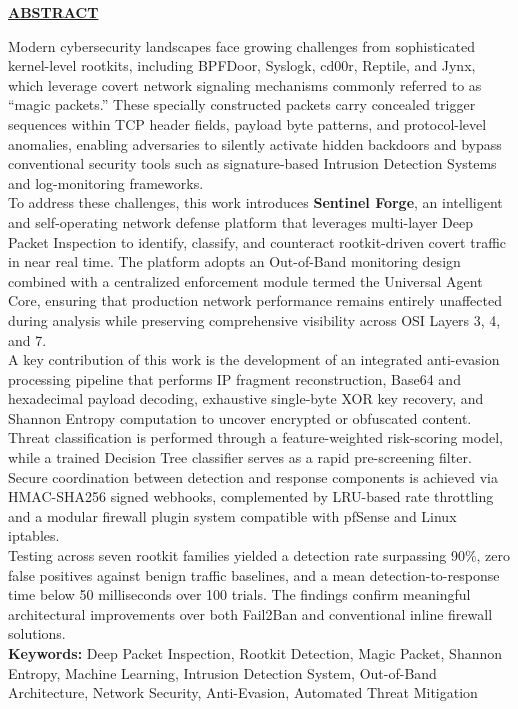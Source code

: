 {\centering
	\par
	\large \textbf{\underline{ABSTRACT}} \par
}\vspace{0.7cm}

\noindent Modern cybersecurity landscapes face growing challenges from sophisticated kernel-level rootkits, including BPFDoor, Syslogk, cd00r, Reptile, and Jynx, which leverage covert network signaling mechanisms commonly referred to as ``magic packets.'' These specially constructed packets carry concealed trigger sequences within TCP header fields, payload byte patterns, and protocol-level anomalies, enabling adversaries to silently activate hidden backdoors and bypass conventional security tools such as signature-based Intrusion Detection Systems and log-monitoring frameworks.\\

\noindent To address these challenges, this work introduces \textbf{Sentinel Forge}, an intelligent and self-operating network defense platform that leverages multi-layer Deep Packet Inspection to identify, classify, and counteract rootkit-driven covert traffic in near real time. The platform adopts an Out-of-Band monitoring design combined with a centralized enforcement module termed the Universal Agent Core, ensuring that production network performance remains entirely unaffected during analysis while preserving comprehensive visibility across OSI Layers 3, 4, and 7.\\

\noindent A key contribution of this work is the development of an integrated anti-evasion processing pipeline that performs IP fragment reconstruction, Base64 and hexadecimal payload decoding, exhaustive single-byte XOR key recovery, and Shannon Entropy computation to uncover encrypted or obfuscated content. Threat classification is performed through a feature-weighted risk-scoring model, while a trained Decision Tree classifier serves as a rapid pre-screening filter. Secure coordination between detection and response components is achieved via HMAC-SHA256 signed webhooks, complemented by LRU-based rate throttling and a modular firewall plugin system compatible with pfSense and Linux iptables.\\

\noindent Testing across seven rootkit families yielded a detection rate surpassing 90\%, zero false positives against benign traffic baselines, and a mean detection-to-response time below 50 milliseconds over 100 trials. The findings confirm meaningful architectural improvements over both Fail2Ban and conventional inline firewall solutions.\\

\noindent\textbf{Keywords:} Deep Packet Inspection, Rootkit Detection, Magic Packet, Shannon Entropy, Machine Learning, Intrusion Detection System, Out-of-Band Architecture, Network Security, Anti-Evasion, Automated Threat Mitigation